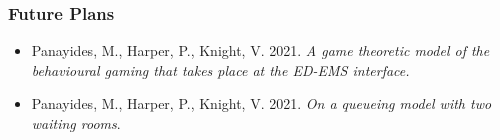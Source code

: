 \begin{frame}
    \frametitle{Future Plans}

    \begin{itemize}
        \item Panayides, M., Harper, P., Knight, V. 2021. \textit{A game theoretic model of the behavioural gaming that takes place at the ED-EMS interface.}
        \item Panayides, M., Harper, P., Knight, V. 2021. \textit{On a queueing model with two waiting rooms}. 
    \end{itemize}

\end{frame}